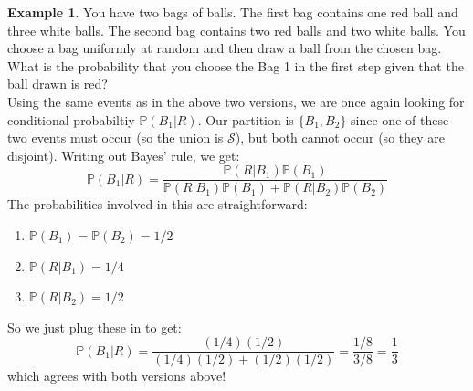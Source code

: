\documentclass[12pt]{article}
\theoremstyle{definition}
\newtheorem*{example}{Example}
\theoremstyle{remark}
\def\P{{\mathbb P}}
\def\cals{{\mathcal S}}
\begin{document}
\begin{example}You have two bags of balls. The first bag contains one red ball and three white balls. The second bag contains two red balls and two white balls. You choose a bag uniformly at random and then draw a ball from the chosen bag. What is the probability that you choose the Bag 1 in the first step given that the ball drawn is red?\\

Using the same events as in the above two versions, we are once again looking for conditional probabiltiy $\P(B_1|R)$. Our partition is $\{B_1, B_2\}$ since one of these two events must occur (so the union is $\cals$), but both cannot occur (so they are disjoint). Writing out Bayes' rule, we get:
\[
\P(B_1|R) = \frac{ \P(R|B_1)\P(B_1)}{ \P(R|B_1)\P(B_1) + \P(R|B_2)\P(B_2) }
\]
The probabilities involved in this are straightforward:
\begin{enumerate}
\item $\P(B_1) = \P(B_2) = 1/2$
\item $\P(R|B_1) = 1/4$
\item $\P(R|B_2) = 1/2$
\end{enumerate}
So we just plug these in to get:
\[
\P(B_1|R) = \frac{ (1/4)(1/2)}{(1/4)(1/2) + (1/2)(1/2) } = \frac{1/8}{3/8} = \frac{1}{3}
\]
which agrees with both versions above!
\end{example}
\end{document}
